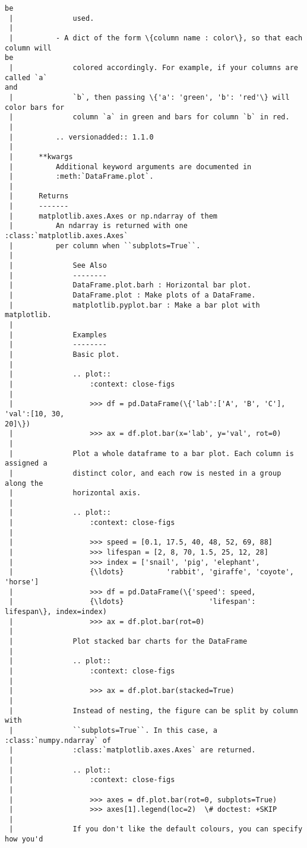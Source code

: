 \documentclass[11pt]{article}
\begin{document}
\begin{Verbatim}[commandchars=\\\{\}]
be
 |              used.
 |
 |          - A dict of the form \{column name : color\}, so that each column will
be
 |              colored accordingly. For example, if your columns are called `a`
and
 |              `b`, then passing \{'a': 'green', 'b': 'red'\} will color bars for
 |              column `a` in green and bars for column `b` in red.
 |
 |          .. versionadded:: 1.1.0
 |
 |      **kwargs
 |          Additional keyword arguments are documented in
 |          :meth:`DataFrame.plot`.
 |
 |      Returns
 |      -------
 |      matplotlib.axes.Axes or np.ndarray of them
 |          An ndarray is returned with one :class:`matplotlib.axes.Axes`
 |          per column when ``subplots=True``.
 |
 |              See Also
 |              --------
 |              DataFrame.plot.barh : Horizontal bar plot.
 |              DataFrame.plot : Make plots of a DataFrame.
 |              matplotlib.pyplot.bar : Make a bar plot with matplotlib.
 |
 |              Examples
 |              --------
 |              Basic plot.
 |
 |              .. plot::
 |                  :context: close-figs
 |
 |                  >>> df = pd.DataFrame(\{'lab':['A', 'B', 'C'], 'val':[10, 30,
20]\})
 |                  >>> ax = df.plot.bar(x='lab', y='val', rot=0)
 |
 |              Plot a whole dataframe to a bar plot. Each column is assigned a
 |              distinct color, and each row is nested in a group along the
 |              horizontal axis.
 |
 |              .. plot::
 |                  :context: close-figs
 |
 |                  >>> speed = [0.1, 17.5, 40, 48, 52, 69, 88]
 |                  >>> lifespan = [2, 8, 70, 1.5, 25, 12, 28]
 |                  >>> index = ['snail', 'pig', 'elephant',
 |                  {\ldots}          'rabbit', 'giraffe', 'coyote', 'horse']
 |                  >>> df = pd.DataFrame(\{'speed': speed,
 |                  {\ldots}                    'lifespan': lifespan\}, index=index)
 |                  >>> ax = df.plot.bar(rot=0)
 |
 |              Plot stacked bar charts for the DataFrame
 |
 |              .. plot::
 |                  :context: close-figs
 |
 |                  >>> ax = df.plot.bar(stacked=True)
 |
 |              Instead of nesting, the figure can be split by column with
 |              ``subplots=True``. In this case, a :class:`numpy.ndarray` of
 |              :class:`matplotlib.axes.Axes` are returned.
 |
 |              .. plot::
 |                  :context: close-figs
 |
 |                  >>> axes = df.plot.bar(rot=0, subplots=True)
 |                  >>> axes[1].legend(loc=2)  \# doctest: +SKIP
 |
 |              If you don't like the default colours, you can specify how you'd

\end{Verbatim}
\end{document}
